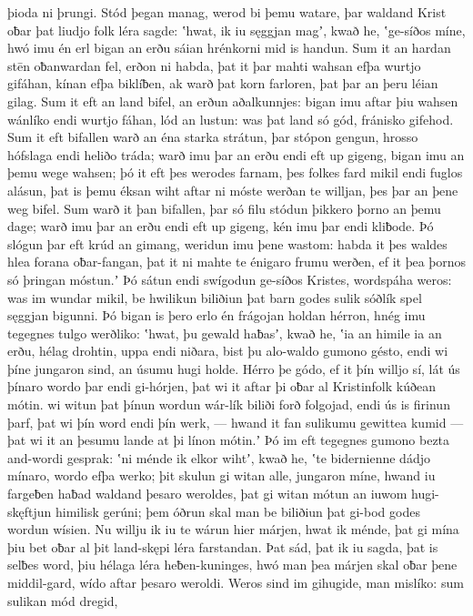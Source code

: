 þioda ni þrungi. Stód þegan manag,
werod bi þemu watare, þar waldand Krist
oƀar þat liudjo folk léra sagde:
ʽhwat, ik iu sęggjan magʼ, kwað he, ʽge-síðos míne,
hwó imu én erl bigan an erðu sáian
hrénkorni mid is handun. Sum it an hardan stēn
oƀanwardan fel, erðon ni habda,
þat it þar mahti wahsan efþa wurtjo gifáhan,
kínan efþa biklíƀen, ak warð þat korn farloren,
þat þar an þeru léian gilag. Sum it eft an land bifel,
an erðun aðalkunnjes: bigan imu aftar þiu
wahsen wánlíko endi wurtjo fáhan,
lód an lustun: was þat land só gód,
fránisko gifehod. Sum it eft bifallen warð
an éna starka strátun, þar stópon gengun,
hrosso hófslaga endi heliðo tráda;
warð imu þar an erðu endi eft up gigeng,
bigan imu an þemu wege wahsen; þó it eft þes werodes farnam,
þes folkes fard mikil endi fuglos alásun,
þat is þemu éksan wiht aftar ni móste
werðan te willjan, þes þar an þene weg bifel.
Sum warð it þan bifallen, þar só filu stódun
þikkero þorno an þemu dage;
warð imu þar an erðu endi eft up gigeng,
kén imu þar endi kliƀode. Þó slógun þar eft krúd an gimang,
weridun imu þene wastom: habda it þes waldes hlea
forana oƀar-fangan, þat it ni mahte te énigaro frumu werðen,
ef it þea þornos só þringan móstun.ʼ
Þó sátun endi swígodun ge-síðos Kristes,
wordspáha weros: was im wundar mikil,
be hwilikun biliðiun þat barn godes
sulik sóðlík spel sęggjan bigunni.
Þó bigan is þero erlo én frágojan
holdan hérron, hnég imu tegegnes
tulgo werðliko: ʽhwat, þu gewald haƀasʼ, kwað he,
ʽia an himile ia an erðu, hélag drohtin,
uppa endi niðara, bist þu alo-waldo
gumono gésto, endi wi þíne jungaron sind,
an úsumu hugi holde. Hérro þe gódo,
ef it þín willjo sí, lát ús þínaro wordo þar
endi gi-hórjen, þat wi it aftar þi
oƀar al Kristinfolk kúðean mótin.
wi witun þat þínun wordun wár-lík biliði
forð folgojad, endi ús is firinun þarf,
þat wi þín word endi þín werk, — hwand it fan sulikumu gewittea kumid —
þat wi it an þesumu lande at þi línon mótin.ʼ
Þó im eft tegegnes gumono bezta
and-wordi gesprak: ʽni ménde ik elkor wihtʼ, kwað he,
ʽte bidernienne dádjo mínaro,
wordo efþa werko; þit skulun gi witan alle,
jungaron míne, hwand iu fargeƀen haƀad
waldand þesaro weroldes, þat gi witan mótun
an iuwom hugi-skęftjun himilisk gerúni;
þem óðrun skal man be biliðiun þat gi-bod godes
wordun wísien. Nu willju ik iu te wárun hier
márjen, hwat ik ménde, þat gi mína þiu bet
oƀar al þit land-skępi léra farstandan.
Þat sád, þat ik iu sagda, þat is selƀes word,
þiu hélaga léra heƀen-kuninges,
hwó man þea márjen skal oƀar þene middil-gard,
wído aftar þesaro weroldi. Weros sind im gihugide,
man mislíko: sum sulikan mód dregid,
